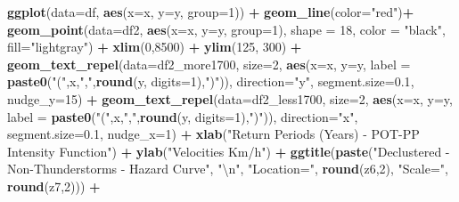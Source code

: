 \documentclass[12pt,twoside]{reedthesis}
\newenvironment{Shaded}{\begin{snugshade}}{\end{snugshade}}
\newcommand{\CharTok}[1]{\textcolor[rgb]{0.31,0.60,0.02}{#1}}
\newcommand{\DataTypeTok}[1]{\textcolor[rgb]{0.13,0.29,0.53}{#1}}
\newcommand{\DecValTok}[1]{\textcolor[rgb]{0.00,0.00,0.81}{#1}}
\newcommand{\FloatTok}[1]{\textcolor[rgb]{0.00,0.00,0.81}{#1}}
\newcommand{\KeywordTok}[1]{\textcolor[rgb]{0.13,0.29,0.53}{\textbf{#1}}}
\newcommand{\NormalTok}[1]{#1}
\newcommand{\OperatorTok}[1]{\textcolor[rgb]{0.81,0.36,0.00}{\textbf{#1}}}
\newcommand{\StringTok}[1]{\textcolor[rgb]{0.31,0.60,0.02}{#1}}
\begin{document}
\begin{Shaded}
\begin{Highlighting}[]
{{\KeywordTok{ggplot}\NormalTok{(}\DataTypeTok{data=}\NormalTok{df, }\KeywordTok{aes}\NormalTok{(}\DataTypeTok{x=}\NormalTok{x, }\DataTypeTok{y=}\NormalTok{y, }\DataTypeTok{group=}\DecValTok{1}\NormalTok{)) }\OperatorTok{+}
\StringTok{  }\KeywordTok{geom_line}\NormalTok{(}\DataTypeTok{color=}\StringTok{"red"}\NormalTok{)}\OperatorTok{+}
\StringTok{  }\KeywordTok{geom_point}\NormalTok{(}\DataTypeTok{data=}\NormalTok{df2, }\KeywordTok{aes}\NormalTok{(}\DataTypeTok{x=}\NormalTok{x, }\DataTypeTok{y=}\NormalTok{y, }\DataTypeTok{group=}\DecValTok{1}\NormalTok{), }\DataTypeTok{shape =} \DecValTok{18}\NormalTok{, }\DataTypeTok{color =} \StringTok{"black"}\NormalTok{, }\DataTypeTok{fill=}\StringTok{"lightgray"}\NormalTok{) }\OperatorTok{+}
\StringTok{  }\KeywordTok{xlim}\NormalTok{(}\DecValTok{0}\NormalTok{,}\DecValTok{8500}\NormalTok{) }\OperatorTok{+}\StringTok{ }
\StringTok{  }\KeywordTok{ylim}\NormalTok{(}\DecValTok{125}\NormalTok{, }\DecValTok{300}\NormalTok{) }\OperatorTok{+}
\StringTok{  }\KeywordTok{geom_text_repel}\NormalTok{(}\DataTypeTok{data=}\NormalTok{df2_more1700, }\DataTypeTok{size=}\DecValTok{2}\NormalTok{, }\KeywordTok{aes}\NormalTok{(}\DataTypeTok{x=}\NormalTok{x, }\DataTypeTok{y=}\NormalTok{y, }\DataTypeTok{label =} \KeywordTok{paste0}\NormalTok{(}\StringTok{"("}\NormalTok{,x,}\StringTok{","}\NormalTok{,}\KeywordTok{round}\NormalTok{(y, }\DataTypeTok{digits=}\DecValTok{1}\NormalTok{),}\StringTok{")"}\NormalTok{)),  }\DataTypeTok{direction=}\StringTok{"y"}\NormalTok{, }\DataTypeTok{segment.size=}\FloatTok{0.1}\NormalTok{, }
   \DataTypeTok{nudge_y=}\DecValTok{15}\NormalTok{) }\OperatorTok{+}\StringTok{ }
\StringTok{  }\KeywordTok{geom_text_repel}\NormalTok{(}\DataTypeTok{data=}\NormalTok{df2_less1700, }\DataTypeTok{size=}\DecValTok{2}\NormalTok{, }\KeywordTok{aes}\NormalTok{(}\DataTypeTok{x=}\NormalTok{x, }\DataTypeTok{y=}\NormalTok{y, }\DataTypeTok{label =} \KeywordTok{paste0}\NormalTok{(}\StringTok{"("}\NormalTok{,x,}\StringTok{","}\NormalTok{,}\KeywordTok{round}\NormalTok{(y, }\DataTypeTok{digits=}\DecValTok{1}\NormalTok{),}\StringTok{")"}\NormalTok{)),  }\DataTypeTok{direction=}\StringTok{"x"}\NormalTok{, }\DataTypeTok{segment.size=}\FloatTok{0.1}\NormalTok{, }
   \DataTypeTok{nudge_x=}\DecValTok{1}\NormalTok{) }\OperatorTok{+}
\StringTok{  }\KeywordTok{xlab}\NormalTok{(}\StringTok{"Return Periods (Years) - POT-PP Intensity Function"}\NormalTok{) }\OperatorTok{+}\StringTok{ }
\StringTok{  }\KeywordTok{ylab}\NormalTok{(}\StringTok{"Velocities Km/h"}\NormalTok{) }\OperatorTok{+}\StringTok{ }
\StringTok{  }\KeywordTok{ggtitle}\NormalTok{(}\KeywordTok{paste}\NormalTok{(}\StringTok{"Declustered - Non-Thunderstorms - Hazard Curve"}\NormalTok{, }\StringTok{"}\CharTok{\textbackslash{}n}\StringTok{"}\NormalTok{, }\StringTok{"Location="}\NormalTok{, }\KeywordTok{round}\NormalTok{(z6,}\DecValTok{2}\NormalTok{),  }\StringTok{"Scale="}\NormalTok{, }\KeywordTok{round}\NormalTok{(z7,}\DecValTok{2}\NormalTok{))) }\OperatorTok{+}\StringTok{ }
}}
\end{Highlighting}
\end{Shaded}
\end{document}
